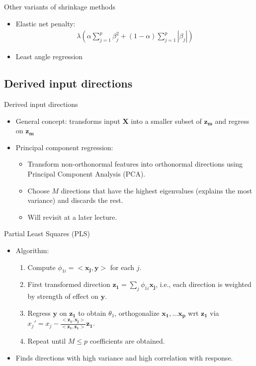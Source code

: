 \documentclass[aspectratio=169]{beamer}
\let \vec \mathbf
\begin{document}
\begin{frame}{Other variants of shrinkage methods}
    \begin{itemize}
        \item Elastic net penalty:
        \begin{eqnarray*}
            \lambda \left( \alpha \sum_{j=1}^p \beta_j^2+ (1-\alpha) \sum_{j=1}^p |\beta_j| \right)
        \end{eqnarray*}
        \item Least angle regression
    \end{itemize}
\end{frame}


\subsection{Derived input directions}

\begin{frame}{Derived input directions}
    \begin{itemize}
        \item General concept: transforms input $\vec{X}$ into a smaller subset of $\vec{z_m}$ and regress on $\vec{z_m}$
        \item Principal component regression:
        \begin{itemize}
            \item Transform non-orthonormal features into orthonormal directions using Principal Component Analysis (PCA).
            \item Choose $M$ directions that have the highest eigenvalues (explains the most variance) and discards the rest.
            \item Will revisit at a later lecture.
        \end{itemize}
    \end{itemize}
\end{frame} 


\begin{frame}{Partial Least Squares (PLS)}
    \begin{itemize}
        \item Algorithm:
        \begin{enumerate}
            \item Compute $\phi_{1i} = <\vec{x_j}, \vec{y}>$ for each $j$.
            \item First transformed direction $\vec{z_1} = \sum_j \phi_{1i} \vec{x_j}$, i.e., each direction is weighted by strength of effect on $\vec{y}$.
            \item Regress $\vec{y}$ on $\vec{z_1}$ to obtain $\theta_1$, orthogonalize $\vec{x_1}, ... \vec{x_p}$ wrt $\vec{z_1}$ via $x_j' = x_j - \frac{<\vec{z_1}, \vec{x_j}>}{<\vec{z_1}, \vec{z_1}>}\vec{z_1}$.
            \item Repeat until $M \leq p$ coefficients are obtained.
        \end{enumerate}
        \item Finds directions with high variance and high correlation with response.
    \end{itemize}
\end{frame} 
\end{document}
